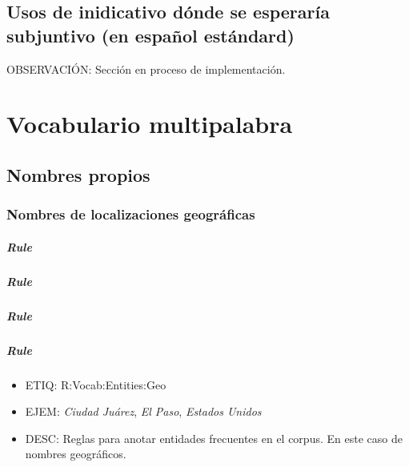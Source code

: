 \documentclass[11pt]{report}
\begin{document}
\section{Usos de inidicativo dónde se esperaría subjuntivo (en español estándard)}
OBSERVACIÓN: Sección en proceso de implementación.

\chapter{Vocabulario multipalabra}
\section{Nombres propios}
\subsection{Nombres de localizaciones geográficas}
\paragraph*{Rule}
\paragraph*{Rule}
\paragraph*{Rule}
\paragraph*{Rule}
\begin{itemize}
\item ETIQ: R:Vocab:Entities:Geo
\item EJEM: \emph{Ciudad Juárez}, \emph{El Paso}, \emph{Estados Unidos}  
\item DESC: Reglas para anotar entidades frecuentes en el corpus. En este caso de nombres geográficos.
\end{itemize}
\end{document}
